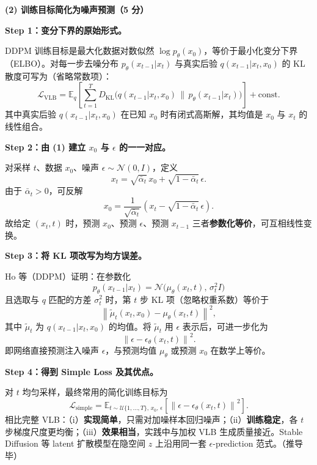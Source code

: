 \documentclass[11pt,a4paper]{article}
\begin{document}
\noindent\textbf{(2) 训练目标简化为噪声预测（5 分）}

\textbf{Step 1：变分下界的原始形式。}

DDPM 训练目标是最大化数据对数似然 $\log p_\theta(x_0)$，等价于最小化变分下界（ELBO）。对每一步去噪分布 $p_\theta(x_{t-1}|x_t)$ 与真实后验 $q(x_{t-1}|x_t,x_0)$ 的 KL 散度可写为（省略常数项）：
\[
\mathcal{L}_{\text{VLB}}=\mathbb{E}_q\!\left[\sum_{t=1}^{T} D_{\mathrm{KL}}\!\big(q(x_{t-1}|x_t,x_0)\,\|\,p_\theta(x_{t-1}|x_t)\big)\right]+\text{const}.
\]
其中真实后验 $q(x_{t-1}|x_t,x_0)$ 在已知 $x_0$ 时有闭式高斯解，其均值是 $x_0$ 与 $x_t$ 的线性组合。

\textbf{Step 2：由 (1) 建立 $x_0$ 与 $\epsilon$ 的一一对应。}

对采样 $t$、数据 $x_0$、噪声 $\epsilon\sim\mathcal{N}(0,I)$，定义
\[
x_t=\sqrt{\bar\alpha_t}\,x_0+\sqrt{1-\bar\alpha_t}\,\epsilon.
\]
由于 $\bar\alpha_t>0$，可反解
\[
x_0=\frac{1}{\sqrt{\bar\alpha_t}}\!\left(x_t-\sqrt{1-\bar\alpha_t}\,\epsilon\right).
\]
故给定 $(x_t,t)$ 时，预测 $x_0$、预测 $\epsilon$、预测 $x_{t-1}$ 三者\textbf{参数化等价}，可互相线性变换。

\textbf{Step 3：将 KL 项改写为均方误差。}

Ho 等（DDPM）证明：在参数化
\[
p_\theta(x_{t-1}|x_t)=\mathcal{N}\!\big(\mu_\theta(x_t,t),\,\sigma_t^2 I\big)
\]
且选取与 $q$ 匹配的方差 $\sigma_t^2$ 时，第 $t$ 步 KL 项（忽略权重系数）等价于
\[
\left\|\tilde\mu_t(x_t,x_0)-\mu_\theta(x_t,t)\right\|^2,
\]
其中 $\tilde\mu_t$ 为 $q(x_{t-1}|x_t,x_0)$ 的均值。将 $\tilde\mu_t$ 用 $\epsilon$ 表示后，可进一步化为
\[
\left\|\epsilon-\epsilon_\theta(x_t,t)\right\|^2.
\]
即网络直接预测注入噪声 $\epsilon$，与预测均值 $\mu_\theta$ 或预测 $x_0$ 在数学上等价。

\textbf{Step 4：得到 Simple Loss 及其优点。}

对 $t$ 均匀采样，最终常用的简化训练目标为
\[
\boxed{\mathcal{L}_{\text{simple}}=\mathbb{E}_{t\sim\mathcal{U}\{1,\ldots,T\},\,x_0,\,\epsilon}\!\left[\left\|\epsilon-\epsilon_\theta(x_t,t)\right\|^2\right].}
\]
相比完整 VLB：（i）\textbf{实现简单}，只需对加噪样本回归噪声；（ii）\textbf{训练稳定}，各 $t$ 步梯度尺度更均衡；（iii）\textbf{效果相当}，实践中与加权 VLB 生成质量接近。Stable Diffusion 等 latent 扩散模型在隐空间 $z$ 上沿用同一套 $\epsilon$-prediction 范式。（推导毕）
\end{document}
